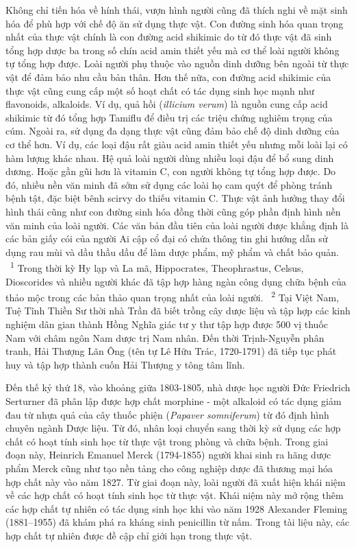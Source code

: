 \documentclass[
  letterpaper,
  DIV=11,
  numbers=noendperiod]{scrartcl}
\begin{document}
Không chỉ tiến hóa về hính thái, vượn hình người cũng đã thích nghi về
mặt sinh hóa để phù hợp với chế độ ăn sử dụng thực vật. Con đường sinh
hóa quan trọng nhất của thực vật chính là con đường acid shikimic do từ
đó thực vật đã sinh tổng hợp dược ba trong số chín acid amin thiết yếu
mà cơ thể loài người không tự tổng hợp được. Loài người phụ thuộc vào
nguồn dinh dưỡng bên ngoài từ thực vật để đảm bảo nhu cầu bản thân. Hơn
thế nữa, con đường acid shikimic của thực vật cũng cung cấp một số hoạt
chất có tác dụng sinh học mạnh như flavonoids, alkaloids. Ví dụ, quả hồi
(\emph{illicium verum}) là nguồn cung cấp acid shikimic từ đó tổng hợp
Tamiflu để điều trị các triệu chứng nghiêm trọng của cúm. Ngoài ra, sử
dụng đa dạng thực vật cũng đảm bảo chế độ dinh dưỡng của cơ thể hơn. Ví
dụ, các loại đậu rất giàu acid amin thiết yếu nhưng mỗi loài lại có hàm
lượng khác nhau. Hệ quả loài người dùng nhiều loại đậu để bổ sung dinh
dương. Hoặc gần gũi hơn là vitamin C, con người không tự tổng hợp được.
Do đó, nhiều nền văn minh đã sớm sử dụng các loài họ cam quýt để phòng
tránh bệnh tật, đặc biệt bênh scirvy do thiếu vitamin C. Thực vật ảnh
hưởng thay đổi hình thái cũng như con đường sinh hóa đồng thời cũng góp
phần định hình nền văn minh của loài người. Các văn bản đầu tiên của
loài người được khẳng định là các bản giấy cói của người Ai cập cổ đại
có chứa thông tin ghi hướng dẫn sử dụng rau mùi và dầu thầu dầu để làm
dược phẩm, mỹ phẩm và chất bảo quản. ~\textsuperscript{1} Trong thời kỳ
Hy lạp và La mã, Hippocrates, Theophrastus, Celsus, Dioscorides và nhiều
người khác đã tập hợp hàng ngàn công dụng chữa bệnh của thảo mộc trong
các bản thảo quan trọng nhất của loài người. ~\textsuperscript{2} Tại
Việt Nam, Tuệ Tĩnh Thiền Sư thời nhà Trần đã biết trồng cây dược liệu và
tập hợp các kinh nghiệm dân gian thành Hồng Nghĩa giác tư y thư tập hợp
được 500 vị thuốc Nam với châm ngôn Nam dược trị Nam nhân. Đến thời
Trịnh-Nguyễn phân tranh, Hải Thượng Lãn Ông (tên tự Lê Hữu Trác,
1720-1791) đã tiếp tục phát huy và tập hợp thành cuốn Hải Thượng y tông
tâm lĩnh.

Đến thế kỷ thứ 18, vào khoảng giữa 1803-1805, nhà dược học người Đức
Friedrich Serturner đã phân lập được hợp chất morphine - một alkaloid có
tác dụng giảm đau từ nhựa quả của cây thuốc phiện (\emph{Papaver
somniferum}) từ đó định hình chuyên ngành Dược liệu. Từ đó, nhân loại
chuyển sang thời kỳ sử dụng các hợp chất có hoạt tính sinh học từ thực
vật trong phòng và chữa bệnh. Trong giai đoạn này, Heinrich Emanuel
Merck (1794-1855) người khai sinh ra hãng dược phẩm Merck cũng như tạo
nền tảng cho công nghiệp dược đã thương mại hóa hợp chất này vào năm
1827. Từ giai đoạn này, loài người đã xuất hiện khái niệm về các hợp
chất có hoạt tính sinh học từ thực vật. Khái niệm này mở rộng thêm các
hợp chất tự nhiên có tác dụng sinh học khi vào năm 1928 Alexander
Fleming (1881--1955) đã khám phá ra kháng sinh penicillin từ nấm. Trong
tài liệu này, các hợp chất tự nhiên được đề cập chỉ giới hạn trong thực
vật.
\end{document}
